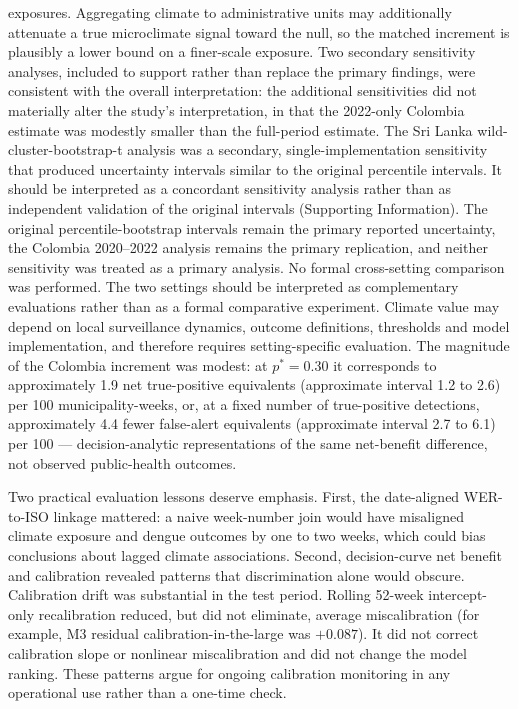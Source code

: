 \documentclass[11pt,a4paper]{article}
\begin{document}
exposures. Aggregating climate to administrative units may additionally attenuate a true microclimate signal toward the null, so the matched increment is plausibly a lower bound on a finer-scale exposure. Two secondary sensitivity analyses, included to support rather than replace the primary findings, were consistent with the overall interpretation: the additional sensitivities did not materially alter the study's interpretation, in that the 2022-only Colombia estimate was modestly smaller than the full-period estimate. The Sri Lanka wild-cluster-bootstrap-t analysis was a secondary, single-implementation sensitivity that produced uncertainty intervals similar to the original percentile intervals. It should be interpreted as a concordant sensitivity analysis rather than as independent validation of the original intervals (Supporting Information). The original percentile-bootstrap intervals remain the primary reported uncertainty, the Colombia 2020--2022 analysis remains the primary replication, and neither sensitivity was treated as a primary analysis. No formal cross-setting comparison was performed. The two settings should be interpreted as complementary evaluations rather than as a formal comparative experiment. Climate value may depend on local surveillance dynamics, outcome definitions, thresholds and model implementation, and therefore requires setting-specific evaluation. The magnitude of the Colombia increment was modest: at $p^*=0.30$ it corresponds to approximately 1.9 net true-positive equivalents (approximate interval 1.2 to 2.6) per 100 municipality-weeks, or, at a fixed number of true-positive detections, approximately 4.4 fewer false-alert equivalents (approximate interval 2.7 to 6.1) per 100 --- decision-analytic representations of the same net-benefit difference, not observed public-health outcomes.

Two practical evaluation lessons deserve emphasis. First, the date-aligned WER-to-ISO linkage mattered: a naive week-number join would have misaligned climate exposure and dengue outcomes by one to two weeks, which could bias conclusions about lagged climate associations. Second, decision-curve net benefit and calibration revealed patterns that discrimination alone would obscure. Calibration drift was substantial in the test period. Rolling 52-week intercept-only recalibration reduced, but did not eliminate, average miscalibration (for example, M3 residual calibration-in-the-large was $+0.087$). It did not correct calibration slope or nonlinear miscalibration and did not change the model ranking. These patterns argue for ongoing calibration monitoring in any operational use rather than a one-time check.
\end{document}
